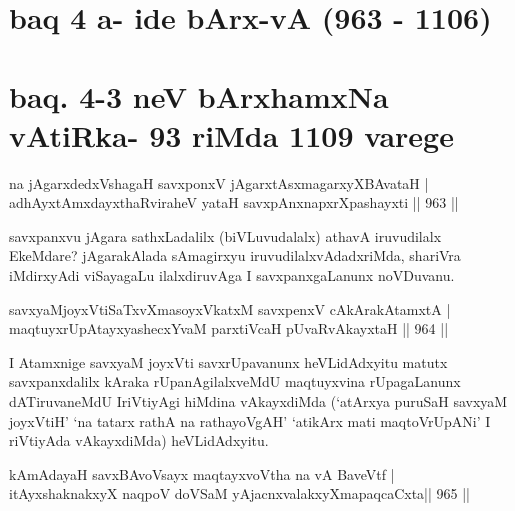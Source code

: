 \section*{baq 4 a- ide bArx-vA (963 - 1106)}

\section*{baq. 4-3 neV bArxhamxNa vAtiRka- 93 riMda 1109 varege}


\begin{shl}
na jAgarxdedxVshagaH savxponxV jAgarxtAsxmagarxyXBAvataH | \\
adhAyxtAmxdayxthaRviraheV yataH savxpAnxnapxrXpashayxti \hfill ||  963 ||  
\end{shl}

\begin{artha}
savxpanxvu jAgara sathxLadalilx (biVLuvudalalx) athavA iruvudilalx EkeMdare? jAgarakAlada sAmagirxyu iruvudilalxvAdadxriMda, shariVra iMdirxyAdi viSayagaLu ilalxdiruvAga I savxpanxgaLanunx noVDuvanu.
\end{artha}


\begin{shl}
savxyaMjoyxVtiSaTxvXmasoyxVkatxM savxpenxV cAkArakAtamxtA | \\
maqtuyxrUpAtayxyashecxYvaM parxtiVcaH pUvaRvAkayxtaH \hfill||  964 ||  
\end{shl}

\begin{artha}
I Atamxnige savxyaM joyxVti savxrUpavanunx heVLidAdxyitu matutx savxpanxdalilx kAraka rUpanAgilalxveMdU maqtuyxvina rUpagaLanunx dATiruvaneMdU IriVtiyAgi hiMdina vAkayxdiMda (`atArxya puruSaH savxyaM joyxVtiH' `na tatarx rathA na rathayoVgAH' `atikArx mati maqtoVrUpANi' I riVtiyAda vAkayxdiMda) heVLidAdxyitu.
\end{artha}


\begin{shl}
\footnotemark[1]kAmAdayaH savxBAvoV\s sayx maqtayxvoV\s tha na vA BaveVtf | \\
itAyxshaknakxyX naqpoV doVSaM yAjacnxvalakxyXmapaqcaCxta\hfill ||  965 ||  
\end{shl}


